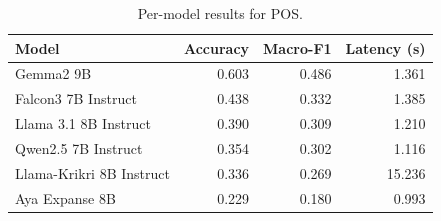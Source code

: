 \begin{table}[t]
\centering
\caption{Per-model results for POS.}
\label{tab:appendix-pos-analysis}
\begin{tabular}{lrrr}
\toprule
Model & Accuracy & Macro-F1 & Latency (s) \\
\midrule
Gemma2 9B & 0.603 & 0.486 & 1.361 \\
Falcon3 7B Instruct & 0.438 & 0.332 & 1.385 \\
Llama 3.1 8B Instruct & 0.390 & 0.309 & 1.210 \\
Qwen2.5 7B Instruct & 0.354 & 0.302 & 1.116 \\
Llama-Krikri 8B Instruct & 0.336 & 0.269 & 15.236 \\
Aya Expanse 8B & 0.229 & 0.180 & 0.993 \\
\bottomrule
\end{tabular}
\end{table}
